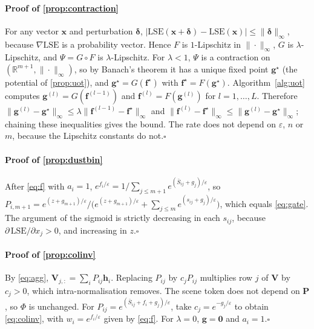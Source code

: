 \paragraph*{Proof of \cref{prop:contraction}}
For any vector $\mathbf{x}$ and perturbation $\boldsymbol{\delta}$,
$|\mathrm{LSE}(\mathbf{x}+\boldsymbol{\delta})-\mathrm{LSE}(\mathbf{x})|\le\|\boldsymbol{\delta}\|_\infty$,
because $\nabla\mathrm{LSE}$ is a probability vector. Hence $F$ is $1$-Lipschitz in
$\|\cdot\|_\infty$, $G$ is $\lambda$-Lipschitz, and $\Psi=G\circ F$ is $\lambda$-Lipschitz. For
$\lambda<1$, $\Psi$ is a contraction on $(\mathbb{R}^{m+1},\|\cdot\|_\infty)$, so by Banach's theorem it
has a unique fixed point $\mathbf{g}^\star$ (the potential of \cref{prop:uot}), and
$\mathbf{g}^\star=G(\mathbf{f}^\star)$ with $\mathbf{f}^\star=F(\mathbf{g}^\star)$. Algorithm~\ref{alg:uot} computes
$\mathbf{g}^{(l)}=G(\mathbf{f}^{(l-1)})$ and $\mathbf{f}^{(l)}=F(\mathbf{g}^{(l)})$ for $l=1,\dots,L$. Therefore
$\|\mathbf{g}^{(l)}-\mathbf{g}^\star\|_\infty\le\lambda\|\mathbf{f}^{(l-1)}-\mathbf{f}^\star\|_\infty$ and
$\|\mathbf{f}^{(l)}-\mathbf{f}^\star\|_\infty\le\|\mathbf{g}^{(l)}-\mathbf{g}^\star\|_\infty$; chaining these
inequalities gives the bound. The rate does not depend on $\varepsilon$, $n$ or $m$, because the
Lipschitz constants do not.\hfill$\square$

\paragraph*{Proof of \cref{prop:dustbin}}
After \eqref{eq:f} with $a_i=1$, $e^{f_i/\varepsilon}=1/\sum_{j\le m+1}e^{(\bar S_{ij}+g_j)/\varepsilon}$, so
$P_{i,m+1}=e^{(z+g_{m+1})/\varepsilon}\big/\big(e^{(z+g_{m+1})/\varepsilon}+\sum_{j\le m}e^{(s_{ij}+g_j)/\varepsilon}\big)$,
which equals \eqref{eq:gate}. The argument of the sigmoid is strictly decreasing in each $s_{ij}$,
because $\partial\,\mathrm{LSE}/\partial x_j>0$, and increasing in $z$.\hfill$\square$

\paragraph*{Proof of \cref{prop:colinv}}
By \eqref{eq:agg}, $\mathbf{V}_{j,:}=\sum_iP_{ij}\mathbf{h}_i$. Replacing $P_{ij}$ by $c_jP_{ij}$ multiplies row
$j$ of $\mathbf{V}$ by $c_j>0$, which intra-normalisation removes. The scene token does not depend on
$\mathbf{P}$, so $\Phi$ is unchanged. For $P_{ij}=e^{(\bar S_{ij}+f_i+g_j)/\varepsilon}$, take
$c_j=e^{-g_j/\varepsilon}$ to obtain \eqref{eq:colinv}, with $w_i=e^{f_i/\varepsilon}$ given by \eqref{eq:f}.
For $\lambda=0$, $\mathbf{g}=\mathbf{0}$ and $a_i=1$.\hfill$\square$

